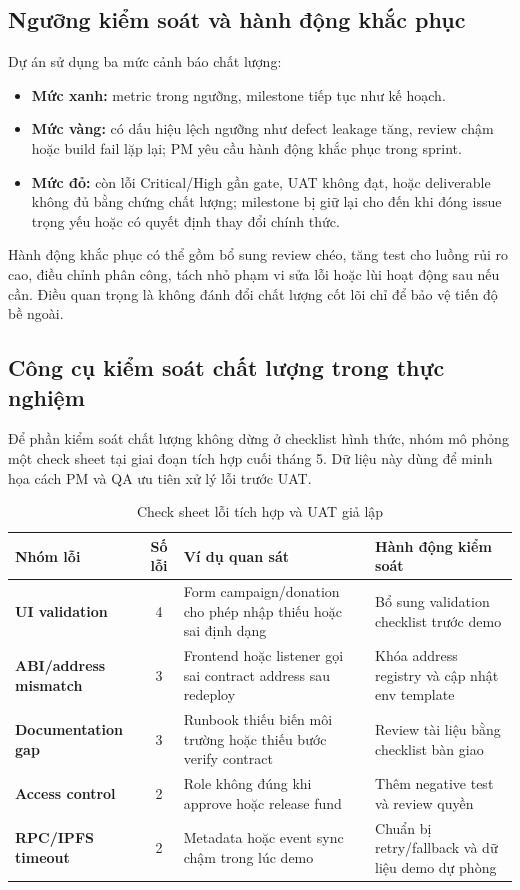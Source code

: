\subsection{Ngưỡng kiểm soát và hành động khắc phục}

Dự án sử dụng ba mức cảnh báo chất lượng:

\begin{itemize}
  \item \textbf{Mức xanh:} metric trong ngưỡng, milestone tiếp tục như kế hoạch.
  \item \textbf{Mức vàng:} có dấu hiệu lệch ngưỡng như defect leakage tăng, review chậm hoặc build fail lặp lại; PM yêu cầu hành động khắc phục trong sprint.
  \item \textbf{Mức đỏ:} còn lỗi Critical/High gần gate, UAT không đạt, hoặc deliverable không đủ bằng chứng chất lượng; milestone bị giữ lại cho đến khi đóng issue trọng yếu hoặc có quyết định thay đổi chính thức.
\end{itemize}

Hành động khắc phục có thể gồm bổ sung review chéo, tăng test cho luồng rủi ro cao, điều chỉnh phân công, tách nhỏ phạm vi sửa lỗi hoặc lùi hoạt động sau nếu cần. Điều quan trọng là không đánh đổi chất lượng cốt lõi chỉ để bảo vệ tiến độ bề ngoài.

\subsection{Công cụ kiểm soát chất lượng trong thực nghiệm}

Để phần kiểm soát chất lượng không dừng ở checklist hình thức, nhóm mô phỏng một check sheet tại giai đoạn tích hợp cuối tháng 5. Dữ liệu này dùng để minh họa cách PM và QA ưu tiên xử lý lỗi trước UAT.

\begin{table}[H]
\centering
\caption{Check sheet lỗi tích hợp và UAT giả lập}
\label{tab:quality-checksheet}
\begin{tabularx}{\textwidth}{| >{\bfseries}p{3.5cm} | c | X | >{\raggedright\arraybackslash}p{3.3cm} |}
\hline
Nhóm lỗi & Số lỗi & Ví dụ quan sát & Hành động kiểm soát \\
\hline
UI validation & 4 & Form campaign/donation cho phép nhập thiếu hoặc sai định dạng & Bổ sung validation checklist trước demo \\ \hline
ABI/address mismatch & 3 & Frontend hoặc listener gọi sai contract address sau redeploy & Khóa address registry và cập nhật env template \\ \hline
Documentation gap & 3 & Runbook thiếu biến môi trường hoặc thiếu bước verify contract & Review tài liệu bằng checklist bàn giao \\ \hline
Access control & 2 & Role không đúng khi approve hoặc release fund & Thêm negative test và review quyền \\ \hline
RPC/IPFS timeout & 2 & Metadata hoặc event sync chậm trong lúc demo & Chuẩn bị retry/fallback và dữ liệu demo dự phòng \\
\hline
\end{tabularx}
\end{table}

